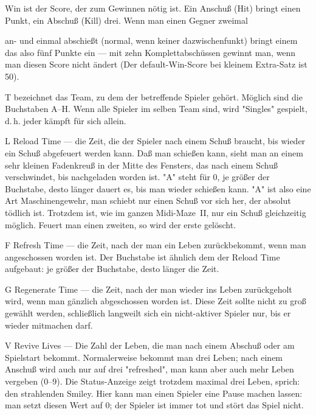 \documentclass[12pt,twoside]{article}
\newcommand{\mmI}{{\sc Midi-Maze}}
\newcommand{\mm}{\mmI~{\sc II}}
\newcommand{\deflabel}[1]{\bf #1\hfill}%
\newenvironment{deflist}[1]%
{\begin{list}{}%
{\settowidth{\labelwidth}{\bf #1}%
\setlength{\leftmargin}{\labelwidth}%
\addtolength{\leftmargin}{\labelsep}%
\renewcommand{\makelabel}{\deflabel}}}%
{\end{list}}%
\begin{document}
\begin{deflist}{Win}

\item[Win] ist der Score, der zum Gewinnen n\"otig ist. Ein Anschu\ss{} (Hit) 
bringt einen Punkt, ein Abschu\ss{} (Kill) drei. Wenn man einen Gegner zweimal 

an- und einmal abschie\ss{}t (normal, wenn keiner dazwischenfunkt) bringt einem 
das also f\"unf Punkte ein --- mit zehn Komplettabsch\"ussen gewinnt man, wenn 
man diesen Score nicht \"andert (Der default-Win-Score bei kleinem Extra-Satz 
ist 50).


\item[T] bezeichnet das Team, zu dem der betreffende Spieler geh\"ort. M\"oglich 
sind die Buchstaben A--H. Wenn alle Spieler im selben Team sind, wird 
"Singles" gespielt, d.\,h. jeder k\"ampft f\"ur sich allein.


\item[L] Reload Time --- die Zeit, die der Spieler nach einem Schu\ss{} braucht, 
bis wieder ein Schu\ss{} abgefeuert werden kann. Da\ss{} man schie\ss{}en kann, sieht 
man an einem sehr kleinen Fadenkreu\ss{} in der Mitte des Fensters, das nach 
einem Schu\ss{} verschwindet, bis nachgeladen worden ist. "A" steht f\"ur 0, je 
gr\"o\ss{}er der Buchstabe, desto l\"anger dauert es, bis man wieder schie\ss{}en kann. 
"A" ist also eine Art Maschinengewehr, man schiebt nur einen Schu\ss{} vor 
sich her, der absolut t\"odlich ist. Trotzdem ist, wie im ganzen \mm, nur ein 
Schu\ss{} gleichzeitig m\"oglich. Feuert man einen zweiten, so wird der erste 
gel\"oscht.


\item[F] Refresh Time --- die Zeit, nach der man ein Leben zur\"uckbekommt, 
wenn man angeschossen worden ist. Der Buchstabe ist \"ahnlich dem der Reload 
Time aufgebaut: je gr\"o\ss{}er der Buchstabe, desto l\"anger die Zeit.


\item[G] Regenerate Time --- die Zeit, nach der man wieder ins Leben 
zur\"uckgeholt wird, wenn man g\"anzlich abgeschossen worden ist. Diese Zeit 
sollte nicht zu gro\ss{} gew\"ahlt werden, schlie\ss{}lich langweilt sich ein 
nicht-aktiver Spieler nur, bis er wieder mitmachen darf.


\item[V] Revive Lives --- Die Zahl der Leben, die man nach einem Abschu\ss{} 
oder am Spielstart bekommt. Normalerweise bekommt man drei Leben; nach einem 
Anschu\ss{} wird auch nur auf drei "refreshed", man kann aber auch mehr Leben 
vergeben (0--9). Die Status-Anzeige zeigt trotzdem maximal drei Leben, 
sprich: den strahlenden Smiley. Hier kann man einen Spieler eine Pause 
machen lassen: man setzt diesen Wert auf 0; der Spieler ist immer tot und 
st\"ort das Spiel nicht.



\end{deflist}
\end{document}

